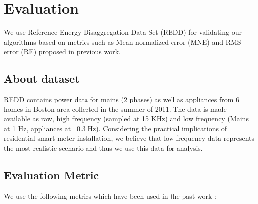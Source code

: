 \documentclass[conference]{IEEEtran}
\newcommand{\figref}[1]{Figure~\ref{#1}}
\begin{document}
\section{Evaluation}

\noindent We use Reference Energy Disaggregation Data Set (REDD) \cite{redd} for validating our algorithms based on metrics such as Mean normalized error (MNE) and RMS error (RE) proposed in previous work.
\subsection{About dataset}
\noindent REDD contains power data for mains (2 phases) as well as appliances from 6 homes in Boston area collected in the summer of 2011. The data is made available as raw, high frequency (sampled at 15 KHz) and low frequency (Mains at 1 Hz, appliances at ~0.3 Hz). Considering the practical implications of residential smart meter installation, we believe that low frequency data represents the most realistic scenario and thus we use this data for analysis. 



%	
%
\subsection{Evaluation Metric}

\noindent We use the following metrics which have been used in the past work \cite{parson2012_aaai,redd}:
\end{document}
